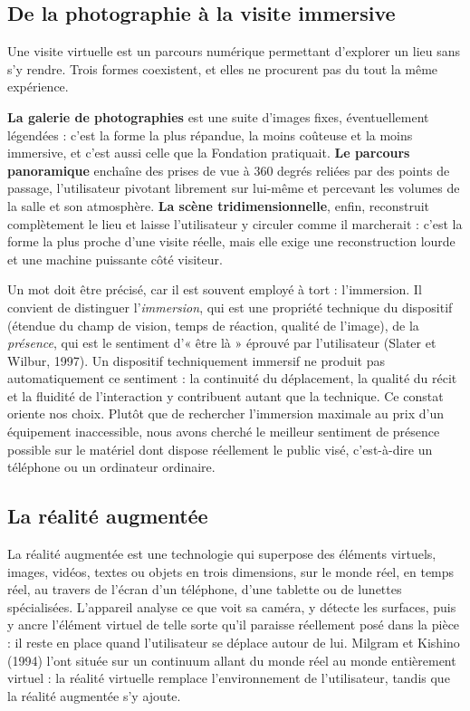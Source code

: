\subsection{De la photographie à la visite immersive}

Une visite virtuelle est un parcours numérique permettant d'explorer un lieu
sans s'y rendre. Trois formes coexistent, et elles ne procurent pas du tout la
même expérience.

\textbf{La galerie de photographies} est une suite d'images fixes,
éventuellement légendées : c'est la forme la plus répandue, la moins coûteuse et
la moins immersive, et c'est aussi celle que la Fondation pratiquait. \textbf{Le
parcours panoramique} enchaîne des prises de vue à 360 degrés reliées par des
points de passage, l'utilisateur pivotant librement sur lui-même et percevant
les volumes de la salle et son atmosphère. \textbf{La scène tridimensionnelle},
enfin, reconstruit complètement le lieu et laisse l'utilisateur y circuler comme
il marcherait : c'est la forme la plus proche d'une visite réelle, mais elle
exige une reconstruction lourde et une machine puissante côté visiteur.

Un mot doit être précisé, car il est souvent employé à tort : l'immersion. Il
convient de distinguer l'\emph{immersion}, qui est une propriété technique du
dispositif (étendue du champ de vision, temps de réaction, qualité de l'image),
de la \emph{présence}, qui est le sentiment d'« être là » éprouvé par
l'utilisateur (Slater et Wilbur, 1997). Un dispositif techniquement immersif ne
produit pas automatiquement ce sentiment : la continuité du déplacement, la
qualité du récit et la fluidité de l'interaction y contribuent autant que la
technique. Ce constat oriente nos choix. Plutôt que de rechercher l'immersion
maximale au prix d'un équipement inaccessible, nous avons cherché le meilleur
sentiment de présence possible sur le matériel dont dispose réellement le public
visé, c'est-à-dire un téléphone ou un ordinateur ordinaire.

\subsection{La réalité augmentée}

La réalité augmentée est une technologie qui superpose des éléments virtuels,
images, vidéos, textes ou objets en trois dimensions, sur le monde réel, en
temps réel, au travers de l'écran d'un téléphone, d'une tablette ou de lunettes
spécialisées. L'appareil analyse ce que voit sa caméra, y détecte les surfaces,
puis y ancre l'élément virtuel de telle sorte qu'il paraisse réellement posé
dans la pièce : il reste en place quand l'utilisateur se déplace autour de lui.
Milgram et Kishino (1994) l'ont située sur un continuum allant du monde réel au
monde entièrement virtuel : la réalité virtuelle remplace l'environnement de
l'utilisateur, tandis que la réalité augmentée s'y ajoute.

